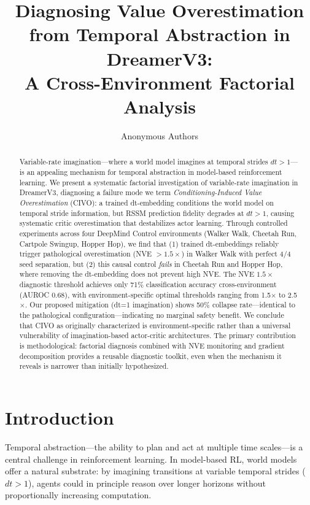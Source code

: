 \documentclass[10pt,twocolumn]{article}
\title{Diagnosing Value Overestimation from Temporal Abstraction in DreamerV3:\\A Cross-Environment Factorial Analysis}
\author{Anonymous Authors}
\date{}
\begin{document}
\maketitle

\begin{abstract}
Variable-rate imagination---where a world model imagines at temporal strides $dt > 1$---is an appealing mechanism for temporal abstraction in model-based reinforcement learning. We present a systematic factorial investigation of variable-rate imagination in DreamerV3, diagnosing a failure mode we term \emph{Conditioning-Induced Value Overestimation} (CIVO): a trained dt-embedding conditions the world model on temporal stride information, but RSSM prediction fidelity degrades at $dt>1$, causing systematic critic overestimation that destabilizes actor learning. Through controlled experiments across four DeepMind Control environments (Walker Walk, Cheetah Run, Cartpole Swingup, Hopper Hop), we find that (1) trained dt-embeddings reliably trigger pathological overestimation (NVE $>1.5\times$) in Walker Walk with perfect 4/4 seed separation, but (2) this causal control \emph{fails} in Cheetah Run and Hopper Hop, where removing the dt-embedding does not prevent high NVE. The NVE $1.5\times$ diagnostic threshold achieves only 71\% classification accuracy cross-environment (AUROC 0.68), with environment-specific optimal thresholds ranging from 1.5$\times$ to 2.5$\times$. Our proposed mitigation (dt=1 imagination) shows 50\% collapse rate---identical to the pathological configuration---indicating no marginal safety benefit. We conclude that CIVO as originally characterized is environment-specific rather than a universal vulnerability of imagination-based actor-critic architectures. The primary contribution is methodological: factorial diagnosis combined with NVE monitoring and gradient decomposition provides a reusable diagnostic toolkit, even when the mechanism it reveals is narrower than initially hypothesized.
\end{abstract}

\section{Introduction}

Temporal abstraction---the ability to plan and act at multiple time scales---is a central challenge in reinforcement learning. In model-based RL, world models offer a natural substrate: by imagining transitions at variable temporal strides ($dt > 1$), agents could in principle reason over longer horizons without proportionally increasing computation.
\end{document}
